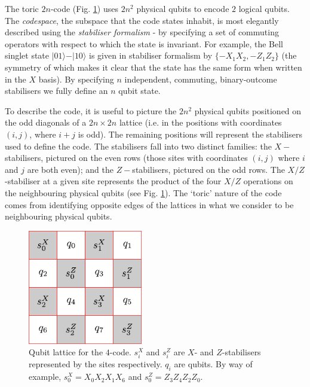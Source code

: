 The toric $2n$-code (Fig. \ref{4-code}) uses $2n^2$ physical qubits to encode $2$ logical qubits. The \textit{codespace}, the subspace  that the code states inhabit, is most elegantly described using the \textit{stabiliser formalism} - by specifying a set of commuting operators with respect to which the state is invariant. For example, the Bell singlet state $\vert01\rangle - \vert10\rangle$ is given in stabiliser formalism by $\{ -X_1 X_2, -Z_1 Z_2 \}$ (the symmetry of which makes it clear that the state has the same form when written in the $X$ basis). By specifying $n$ independent, commuting, binary-outcome stabilisers we fully define an $n$ qubit state.

To describe the code, it is useful to picture the $2n^2$ physical qubits positioned on the odd diagonals of a $2n \times 2n$ lattice (i.e. in the positions with coordinates $(i,j)$, where $i+j$ is odd). The remaining positions will represent the stabilisers used to define the code. The stabilisers fall into two distinct families: the $X-$stabilisers, pictured on the even rows (those sites with coordinates $(i,j)$ where $i$ and $j$ are both even); and the $Z-$stabilisers, pictured on the odd rows. The $X/Z$-stabiliser at a given site represents the product of the four $X/Z$ operations on the neighbouring physical qubits (see Fig. \ref{4-code}). The `toric' nature of the code comes from identifying opposite edges of the lattices in what we consider to be neighbouring physical qubits. 

\begin{figure}[htb]
  \begin{center}
    \includegraphics[width=5cm]{assets/4-code.pdf}
  \end{center}
  \caption{Qubit lattice for the $4$-code. $s_i^X$ and $s_i^Z$ are $X$- and $Z$-stabilisers represented by the sites respectively. $q_i$ are qubits. By way of example, $s_0^X = X_0 X_2 X_1 X_6$ and $s_0^Z = Z_3 Z_4 Z_2 Z_0$.}
  \label{4-code}
\end{figure}

